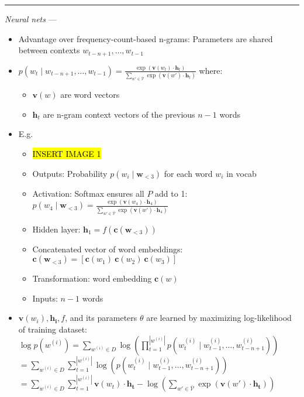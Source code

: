 {\color{lightgray}\hrule height 0.001mm}

\emph{Neural nets} ---
\begin{itemize}
    \item Advantage over frequency-count-based n-grams: Parameters are shared between contexts $w_{t-n+1}, \ldots, w_{t-1}$
    \item 
    $
    p(w_t \mid w_{t-n+1}, \ldots, w_{t-1}) = \frac{\exp(\mathbf{v}(w_t) \cdot \mathbf{h}_t)}{\sum_{w' \in \bar{\mathcal{V}}} \exp(\mathbf{v}(w') \cdot \mathbf{h}_t)}
    $
    where:
    \begin{itemize}
        \item $\mathbf{v}(w)$ are word vectors
        \item $\mathbf{h}_t$ are n-gram context vectors of the previous $n-1$ words
    \end{itemize}
    \item E.g.
    \begin{itemize}
        \item \hl{INSERT IMAGE 1}
        \item Outputs: Probability $p(w_i \mid \boldsymbol{w}_{<3})$ for each word $w_i$ in vocab
        \item Activation: Softmax ensures all $P$ add to 1:
        $
        p(w_4 \mid \boldsymbol{w}_{<3}) = \frac{\exp \left( \boldsymbol{v}(w_4) \cdot \boldsymbol{h}_4 \right)}{\sum_{w' \in \bar{\mathcal{V}}} \exp \left( \boldsymbol{v}(w') \cdot \boldsymbol{h}_4 \right)}
        $
        \item Hidden layer:
        $
        \boldsymbol{h}_1 = f(\boldsymbol{c}(\boldsymbol{w}_{<3}))
        $
        \item Concatenated vector of word embeddings:
        $
        \boldsymbol{c}(\boldsymbol{w}_{<3}) = [\boldsymbol{c}(w_1) \ \boldsymbol{c}(w_2) \ \boldsymbol{c}(w_3)]
        $
        \item Transformation: word embedding $\boldsymbol{c}(w)$
        \item Inputs: $n-1$ words
    \end{itemize}
    \item $\boldsymbol{v}(w_i), \boldsymbol{h_i}, f$, and its parameters $\theta$ are learned by maximizing log-likelihood of training dataset:
    $
    \log p(w^{(i)}) = \sum_{w^{(i)} \in D} \log \left( \prod_{t=1}^{|w^{(i)}|} p(w_t^{(i)} \mid w_{t-1}^{(i)}, \dots, w_{t-n+1}^{(i)}) \right)
    $\\
    $ = \sum_{w^{(i)} \in D} \sum_{t=1}^{|w^{(i)}|} \log \left( p(w_t^{(i)} \mid w_{t-1}^{(i)}, \dots, w_{t-n+1}^{(i)}) \right)$\\
    $ = \sum_{w^{(i)} \in D} \sum_{t=1}^{|w^{(i)}|} \boldsymbol{v}(w_t) \cdot \boldsymbol{h_t} - \log(\sum_{w' \in \bar{\mathcal{V}}} \exp ( \boldsymbol{v}(w') \cdot \boldsymbol{h_t}))$
\end{itemize}

